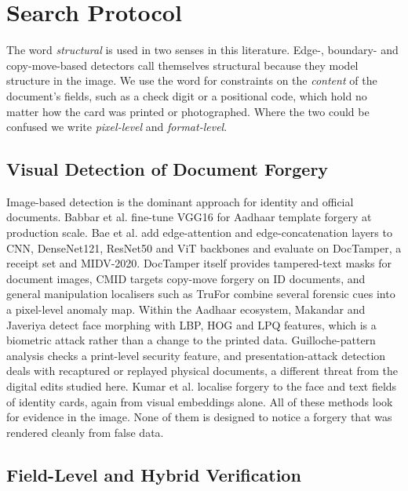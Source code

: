 \documentclass[VANCOUVER,Times1COL]{WileyNJDv5}
\begin{document}
\section{Search Protocol}
\label{sec:related}

The word \emph{structural} is used in two senses in this literature.
Edge-, boundary- and copy-move-based detectors call themselves
structural because they model structure in the image. We use the word
for constraints on the \emph{content} of the document's fields, such as
a check digit or a positional code, which hold no matter how the card
was printed or photographed. Where the two could be confused we write
\emph{pixel-level} and \emph{format-level}.

\subsection{Visual Detection of Document Forgery}

Image-based detection is the dominant approach for identity and
official documents. Babbar et al.\cite{babbar} fine-tune VGG16 for
Aadhaar template forgery at production scale. Bae et
al.\cite{bae} add edge-attention and edge-concatenation layers to CNN,
DenseNet121, ResNet50\cite{resnet} and ViT backbones and evaluate on
DocTamper\cite{doctamper}, a receipt set and MIDV-2020\cite{midv}.
DocTamper itself provides tampered-text masks for document images, CMID
targets copy-move forgery on ID documents\cite{cmid}, and general
manipulation localisers such as TruFor\cite{trufor} combine several
forensic cues into a pixel-level anomaly map. Within the Aadhaar
ecosystem, Makandar and Javeriya\cite{morph} detect face morphing with
LBP, HOG and LPQ features, which is a biometric attack rather than a
change to the printed data. Guilloche-pattern analysis\cite{guilloche}
checks a print-level security feature, and presentation-attack
detection\cite{pad} deals with recaptured or replayed physical
documents, a different threat from the digital edits studied here.
Kumar et al.\cite{flid} localise forgery to the face and text fields
of identity cards, again from visual embeddings alone. All of these
methods look for evidence in the image. None of them is
designed to notice a forgery that was rendered cleanly from false data.

\subsection{Field-Level and Hybrid Verification}
\end{document}
